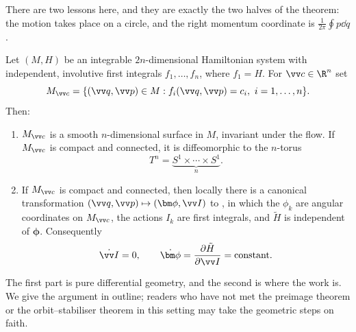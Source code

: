 There are two lessons here, and they are exactly the two halves of the theorem: the motion takes place on a circle, and the right momentum coordinate is $\frac{1}{2\pi}\oint p\dd q$.

\begin{theorem}
	Let $(M, H)$ be an integrable $2n$-dimensional Hamiltonian system with independent, involutive first integrals $f_1, \dots, f_n$, where $f_1 = H$. For $\vv c \in \R^n$ set
	$$
	M_{\vv c} = \{(\vv q, \vv p)\in M : f_i(\vv q, \vv p) = c_i, \ i = 1,\dots, n\}.
	$$
	Then:
	\begin{enumerate}[label=(\roman*)]
		\item $M_{\vv c}$ is a smooth $n$-dimensional surface in $M$, invariant under the flow. If $M_{\vv c}$ is compact and connected, it is diffeomorphic to the $n$-torus
		$$
		T^n = \underbrace{S^1\times\cdots\times S^1}_{n}.
		$$
		\item If $M_{\vv c}$ is compact and connected, then locally there is a canonical transformation $(\vv q, \vv p)\mapsto (\bm\phi, \vv I)$ to , in which the $\phi_k$ are angular coordinates on $M_{\vv c}$, the actions $I_k$ are first integrals, and $\tilde H$ is independent of $\bm\phi$. Consequently
		$$
		\dot{\vv I} = 0, \qquad \dot{\bm\phi} = \frac{\partial \tilde H}{\partial \vv I} = \text{constant}.
		$$
	\end{enumerate}
\end{theorem}

The first part is pure differential geometry, and the second is where the work is. We give the argument in outline; readers who have not met the preimage theorem or the orbit--stabiliser theorem in this setting may take the geometric steps on faith.

